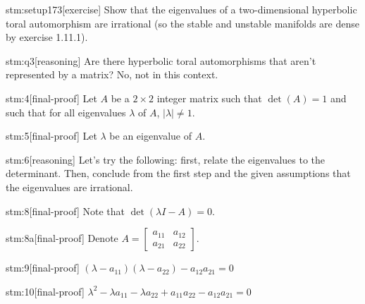 \documentclass{article}
\begin{document}

\begin{stm}{stm:setup173}[exercise]
Show that the eigenvalues of a two-dimensional hyperbolic toral automorphism are irrational (so the stable and unstable manifolds are dense by exercise 1.11.1).
\end{stm}


\begin{stm}{stm:q3}[reasoning]
Are there hyperbolic toral automorphisms that aren't represented by a matrix? No, not in this context.
\end{stm}

\begin{stm}{stm:4}[final-proof]
Let $A$ be a $2 \times 2$ integer matrix such that $\det(A) = 1$ and such that for all eigenvalues $\lambda$ of $A$, $|\lambda| \neq 1$.
\end{stm}

\begin{stm}{stm:5}[final-proof]
Let $\lambda$ be an eigenvalue of $A$.
\end{stm}

\begin{stm}{stm:6}[reasoning]
Let's try the following: first, relate the eigenvalues to the determinant. Then, conclude from the first step and the given assumptions that the eigenvalues are irrational.
\end{stm}

\begin{stm}{stm:8}[final-proof]
Note that $\det(\lambda I - A) = 0$.
\end{stm}

\begin{stm}{stm:8a}[final-proof]
Denote $A = \begin{bmatrix} a_{11} & a_{12} \\ a_{21} & a_{22} \end{bmatrix}$.
\end{stm}

\begin{stm}{stm:9}[final-proof]
$(\lambda - a_{11})(\lambda - a_{22}) - a_{12}a_{21} = 0$
\end{stm}

\begin{stm}{stm:10}[final-proof]
$\lambda^2 - \lambda a_{11} - \lambda a_{22} + a_{11}a_{22} - a_{12}a_{21} = 0$
\end{stm}
\end{document}
